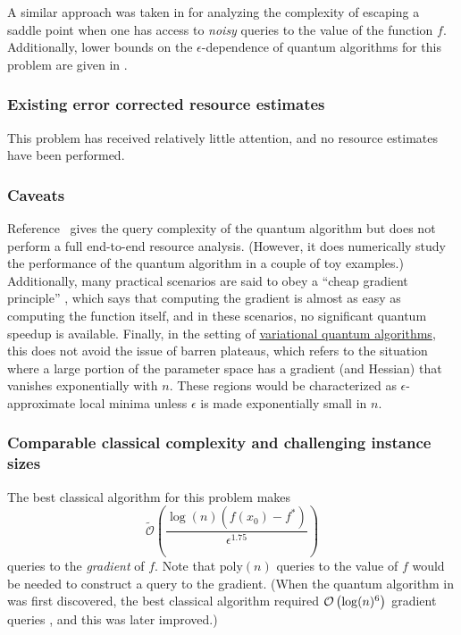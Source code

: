 \begin{refsection}
A similar approach was taken in \cite{gong2022robustnessNonconvex} for analyzing the complexity of escaping a saddle point when one has access to \emph{noisy} queries to the value of the function $f$. Additionally, lower bounds on the $\epsilon$-dependence of quantum algorithms for this problem are given in \cite{zhang2022lowerBoundsNonconvex}.

\subsubsection*{Existing error corrected resource estimates}

This problem has received relatively little attention, and no resource estimates have been performed. 

\subsubsection*{Caveats}

Reference~\cite{zhang2021escapingSaddlePoints} gives the query complexity of the quantum algorithm but does not perform a full end-to-end resource analysis. (However, it does numerically study the performance of the quantum algorithm in a couple of toy examples.) Additionally, many practical scenarios are said to obey a ``cheap gradient principle'' \cite{griewank2008EvalDerivatives,bolte2022nonsmooth}, which says that computing the gradient is almost as easy as computing the function itself, and in these scenarios, no significant quantum speedup is available.  
Finally, in the setting of \hyperref[prim:VQA]{variational quantum algorithms}, this does not avoid the issue of barren plateaus, which refers to the situation where a large portion of the parameter space has a gradient (and Hessian) that vanishes exponentially with $n$. These regions would be characterized as $\epsilon$-approximate local minima unless $\epsilon$ is made exponentially small in $n$. 

\subsubsection*{Comparable classical complexity and challenging instance sizes}

The best classical algorithm \cite{zhang2021classicalEscapeSaddlePoints} for this problem makes
\begin{equation}
    \tilde{\mathcal{O}}\left(\frac{\log(n)(f(x_0)-f^*)}{\epsilon^{1.75}}\right)
\end{equation}
queries to the \emph{gradient} of $f$. Note that $\text{poly}(n)$ queries to the value of $f$ would be needed to construct a query to the gradient. (When the quantum algorithm in \cite{zhang2021escapingSaddlePoints} was first discovered, the best classical algorithm required $\mathcal{O}\left( \log(n)^6 \right)$ gradient queries \cite[Theorem 3]{jin2018EscapesSaddlePoints}, and this was later improved.)


\end{refsection}
